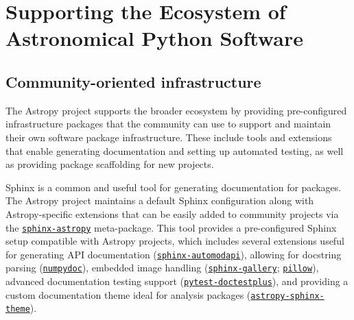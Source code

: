\documentclass[modern]{aastex631}
\newcommand{\secauthor}[1]{{\color{blue}Author:~\textit{#1}}}
\begin{document}

\section{Supporting the Ecosystem of Astronomical Python Software}
\label{sec:ecosystem}

\subsection{Community-oriented infrastructure}


The Astropy project supports the broader ecosystem by providing pre-configured
infrastructure packages that the community can use to support and maintain their
own software package infrastructure. These include tools and extensions that
enable generating documentation and setting up automated testing, as well
as providing package scaffolding for new projects.

Sphinx is a common and useful tool for generating documentation for \python
packages. The Astropy project maintains a default Sphinx configuration along
with Astropy-specific extensions that can be easily added to community
projects via the
\href{https://github.com/astropy/sphinx-astropy}{\texttt{sphinx-astropy}}
meta-package. This tool provides a pre-configured Sphinx setup compatible with
Astropy projects, which includes several extensions useful for generating API
documentation
(\href{https://github.com/astropy/sphinx-automodapi}{\texttt{sphinx-automodapi}}),
allowing for  docstring parsing
(\href{https://github.com/numpy/numpydoc}{\texttt{numpydoc}}), embedded image
handling
(\href{https://github.com/sphinx-gallery/sphinx-gallery}{\texttt{sphinx-gallery}};
\href{https://github.com/python-pillow}{\texttt{pillow}}), advanced
documentation testing support
(\href{https://github.com/astropy/pytest-doctestplus}{\texttt{pytest-doctestplus}}),
and providing a custom documentation theme ideal for analysis packages
(\href{https://github.com/astropy/sphinx-astropy}{\texttt{astropy-sphinx-theme}}).
\end{document}
